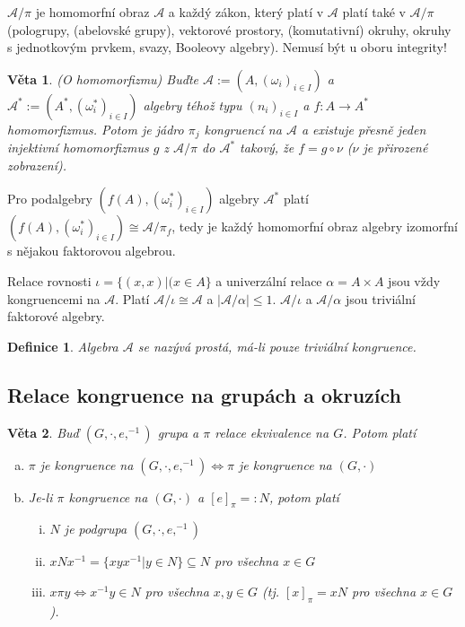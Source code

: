 \documentclass[a4paper, 11pt]{report}
\newtheorem{mydef}{Definice}[chapter]
\newtheorem{veta}{Věta}[chapter]
\begin{document}
$\mathcal{A}/\pi$ je homomorfní obraz $\mathcal{A}$ a každý zákon, který platí v $\mathcal{A}$ platí také v $\mathcal{A}/\pi$ (pologrupy, (abelovské grupy), vektorové prostory, (komutativní) okruhy, okruhy s jednotkovým prvkem, svazy, Booleovy algebry). Nemusí být u oboru integrity!

\begin{veta}
(O homomorfizmu) Buďte $\mathcal{A} := (A, (\omega_i)_{i \in I})$ a  $\mathcal{A^*} := (A^*, (\omega_i^*)_{i \in I})$ algebry téhož typu $(n_i)_{i \in I}$ a $f: A \to A^*$ homomorfizmus. Potom je jádro $\pi_j$ kongruencí na $\mathcal{A}$ a existuje přesně jeden injektivní homomorfizmus $g$ z $\mathcal{A}/\pi$ do $\mathcal{A}^*$ takový, že $f = g \circ \nu$ ($\nu$ je přirozené zobrazení).
\end{veta}

Pro podalgebry $(f(A), (\omega_i^*)_{i \in I})$ algebry $\mathcal{A}^*$ platí $(f(A), (\omega_i^*)_{i \in I}) \cong \mathcal{A}/\pi_f$, tedy je každý homomorfní obraz algebry izomorfní s nějakou faktorovou algebrou.

Relace rovnosti $\iota = \{(x, x) | (x \in A\}$ a univerzální relace $\alpha = A \times A$ jsou vždy kongruencemi na $\mathcal{A}$. Platí $\mathcal{A}/\iota \cong \mathcal{A}$ a $|\mathcal{A}/\alpha| \leq 1$. $\mathcal{A}/\iota$ a $\mathcal{A}/\alpha$ jsou triviální faktorové algebry.

\begin{mydef}
Algebra $\mathcal{A}$ se nazývá prostá, má-li pouze triviální kongruence.
\end{mydef}

\subsection{Relace kongruence na grupách a okruzích}

\begin{veta}
Buď $(G, \cdot, e, ^{-1})$ grupa a $\pi$ relace ekvivalence na $G$. Potom platí
\begin{enumerate}[a)]
	\item $\pi$ je kongruence na $(G, \cdot, e, ^{-1}) \Leftrightarrow \pi$ je kongruence na $(G, \cdot)$
	\item Je-li $\pi$ kongruence na $(G, \cdot)$ a $[e]_\pi =: N$, potom platí
	\begin{enumerate}[i)]
		\item $N$ je podgrupa $(G, \cdot, e, ^{-1})$
		\item $x N x^{-1} = \{x y x^{-1} | y \in N\} \subseteq N$ pro všechna $x \in G$ 
		\item $x \pi y \Leftrightarrow x^{-1} y \in N$ pro všechna $x, y \in G$ (tj. $[x]_\pi = x N$ pro všechna $x \in G$).
	\end{enumerate}
\end{enumerate}
\end{veta}
\end{document}
